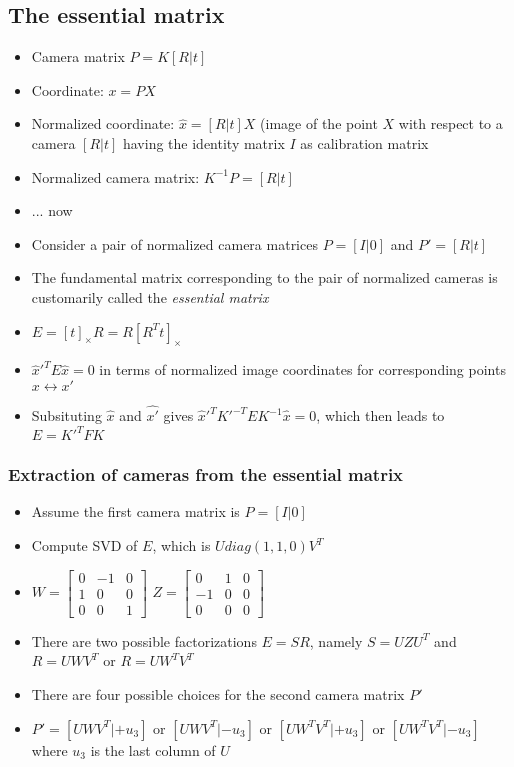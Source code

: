 \documentclass[a4paper]{article}
\begin{document}
\subsection*{The essential matrix}
\begin{itemize}
    \item
        Camera matrix $P = K[R|t]$
    \item
        Coordinate: $x = PX$
    \item
        Normalized coordinate: $\hat{x} = [R|t] X$ (image of the point $X$ with respect to a camera $[R|t]$ having the identity matrix $I$ as calibration matrix
    \item
        Normalized camera matrix: $K^{-1} P = [R|t]$
    \item
        ... now
    \item
        Consider a pair of normalized camera matrices $P = [I | 0]$ and $P' = [R|t]$
    \item
        The fundamental matrix corresponding to the pair of normalized cameras is customarily called the \textit{essential matrix}
    \item
        $E = [t]_{\times} R = R[R^{T} t]_{\times}$
    \item
        $\hat{x}'^T E \hat{x} = 0$ in terms of normalized image coordinates for corresponding points $x \leftrightarrow x'$
    \item
        Subsituting $\hat{x}$ and $\hat{x'}$ gives $\hat{x}'^T K'^{-T} E K^{-1} \hat{x} = 0$, which then leads to $E = K'^T F K$
\end{itemize}

\subsubsection*{Extraction of cameras from the essential matrix}
\begin{itemize}
    \item
        Assume the first camera matrix is $P = [I|0]$
    \item
        Compute SVD of $E$, which is $U diag(1,1,0) V^T$
    \item
        $W = \begin{bmatrix}
            0 & -1 & 0 \\ 1 & 0 & 0 \\ 0 & 0 & 1
        \end{bmatrix}$
        $Z = \begin{bmatrix}
            0 & 1 & 0 \\ -1 & 0 & 0 \\ 0 & 0 & 0
        \end{bmatrix}$
    \item
        There are two possible factorizations $E = SR$, namely $S = UZU^T$ and $R = UWV^T$ or $R = U W^T V^T$
    \item
        There are four possible choices for the second camera matrix $P'$
    \item
        $P' = [UWV^T | +u_3]$ or $[UWV^T| -u_3]$ or $[UW^TV^T| + u_3]$ or $[UW^TV^T| -u_3]$ where $u_3$ is the last column of $U$
\end{itemize}
\end{document}
